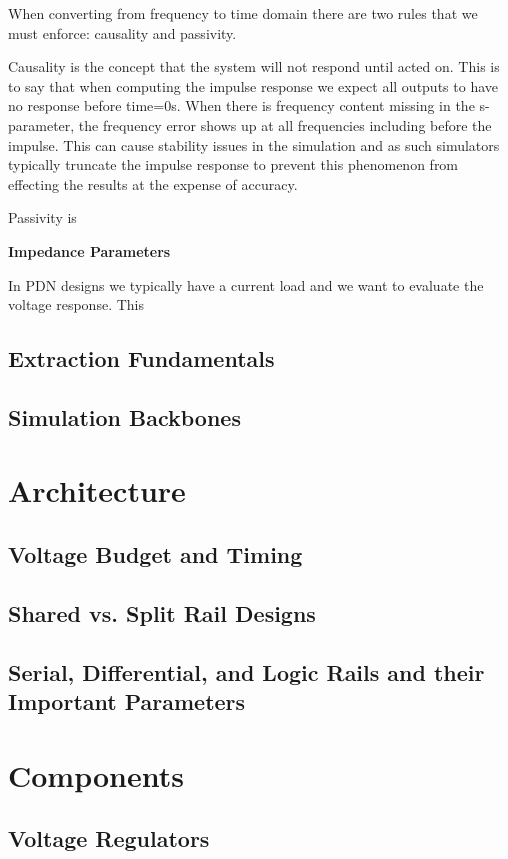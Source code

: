 \documentclass{book}
\begin{document}
When converting from frequency to time domain there are two rules that we must enforce: causality and passivity. 

Causality is the concept that the system will not respond until acted on.  This is to say that when computing the impulse response we expect all outputs to have no response before time=0s.  When there is frequency content missing in the s-parameter, the frequency error shows up at all frequencies including before the impulse.  This can cause stability issues in the simulation and as such simulators typically truncate the impulse response to prevent this phenomenon from effecting the results at the expense of accuracy.

Passivity is 




\textbf{Impedance Parameters}

In PDN designs we typically have a current load and we want to evaluate the voltage response.  This 




\section{Extraction Fundamentals}
\section{Simulation Backbones}

\chapter{Architecture}
\section{Voltage Budget and Timing}
\section{Shared vs. Split Rail Designs}
\section{Serial, Differential, and Logic Rails and their Important Parameters}


\chapter{Components}
\section{Voltage Regulators}
\end{document}
